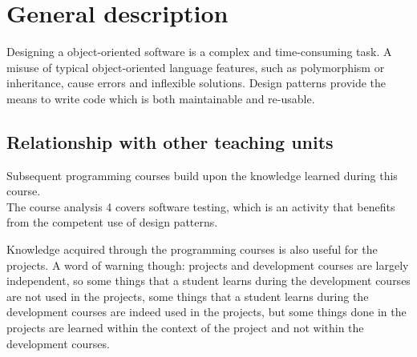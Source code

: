 \section{General description}
		Designing a object-oriented software is a complex and time-consuming task. A misuse of typical object-oriented language features, such as polymorphism or inheritance, cause errors and inflexible solutions. Design patterns provide the means to write code which is both maintainable and re-usable. \\
		

	\subsection{Relationship with other teaching units}
		Subsequent programming courses build upon the knowledge learned during this course.	\\
		
		The course analysis 4 covers software testing, which is an activity that benefits from the competent use of design patterns.
		
		Knowledge acquired through the programming courses is also useful for the projects. A word of warning though: projects and development courses are largely independent, so some things that a student learns during the development courses are not used in the projects, some things that a student learns during the development courses are indeed used in the projects, but some things done in the projects are learned within the context of the project and not within the development courses.

